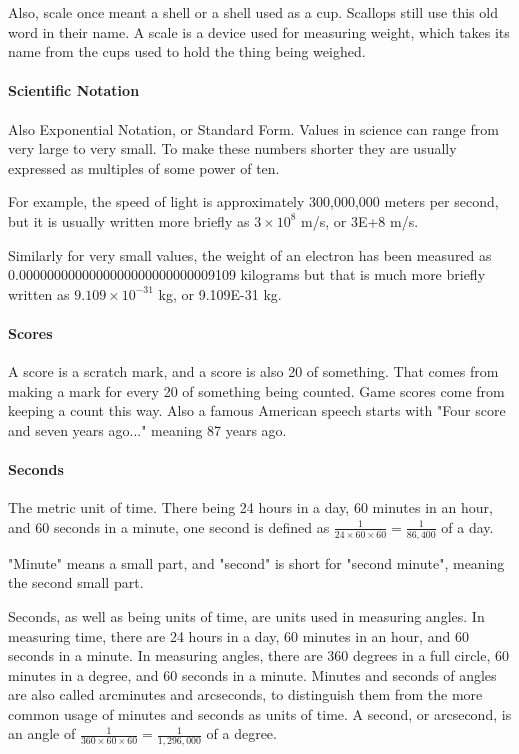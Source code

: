 \documentclass[12pt]{article}
\begin{document}
Also, scale once meant a shell or a shell used as a cup. Scallops still use this old word in their name. A scale is a device used for measuring weight, which takes its name from the cups used to hold the thing being weighed.

\paragraph{Scientific Notation}
Also Exponential Notation, or Standard Form. Values in science can range from very large to very small. To make these numbers shorter they are usually expressed as multiples of some power of ten.

For example, the speed of light is approximately 300,000,000 meters per second, but it is usually written more briefly as $3\times10^8$ m/s, or 3E+8 m/s.

Similarly for very small values, the weight of an electron has been measured as\\0.0000000000000000000000000009109 kilograms but that is much more briefly written as $9.109\times10^{-31}$ kg, or 9.109E-31 kg.

\paragraph{Scores}
A score is a scratch mark, and a score is also 20 of something. That comes from making a mark for every 20 of something being counted. Game scores come from keeping a count this way. Also a famous American speech starts with "Four score and seven years ago..." meaning 87 years ago.

\paragraph{Seconds}
The metric unit of time. There being 24 hours in a day, 60 minutes in an hour, and 60 seconds in a minute, one second is defined as $\frac{1}{24\times60\times60}=\frac{1}{86,400}$ of a day.

"Minute" means a small part, and "second" is short for "second minute", meaning the second small part.

Seconds, as well as being units of time, are units used in  measuring angles. In measuring time, there are 24 hours in a day, 60 minutes in an hour, and 60 seconds in a minute. In measuring angles, there are 360 degrees in a full circle, 60 minutes in a degree, and 60 seconds in a minute. Minutes and seconds of angles are also called arcminutes and arcseconds, to distinguish them from the more common usage of minutes and seconds as units of time. A second, or arcsecond, is an angle of $\frac{1}{360\times60\times60}=\frac{1}{1,296,000}$ of a degree.
\end{document}
